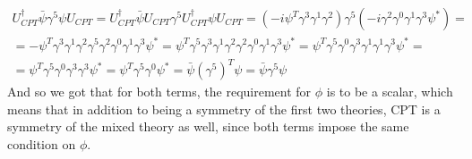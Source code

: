 \documentclass{article}
\begin{document}
\begin{equation}
\begin{gathered}
    U_{CPT}^\dagger \bar{\psi}\gamma^5\psi U_{CPT} = 
    U_{CPT}^\dagger \bar{\psi} U_{CPT} \gamma^5 U_{CPT}^\dagger \psi U_{CPT} = 
    \left(-i\psi^T\gamma^3\gamma^1\gamma^2\right) \gamma^5 \left(-i\gamma^2\gamma^0\gamma^1\gamma^3\psi^*\right) = \\ =
    -\psi^T\gamma^3\gamma^1\gamma^2\gamma^5\gamma^2\gamma^0\gamma^1\gamma^3\psi^* =
    \psi^T\gamma^5\gamma^3\gamma^1\gamma^2\gamma^2\gamma^0\gamma^1\gamma^3\psi^* =
    \psi^T\gamma^5\gamma^0\gamma^3\gamma^1\gamma^1\gamma^3\psi^* = \\ =
    \psi^T\gamma^5\gamma^0\gamma^3\gamma^3\psi^* =
    \psi^T\gamma^5\gamma^0\psi^* = \bar{\psi}\left(\gamma^5\right)^T\psi = \bar{\psi}\gamma^5\psi
\end{gathered}
\end{equation}
And so we got that for both terms, the requirement for $\phi$ is to be a scalar, which means that in addition to being a symmetry of the first two theories, CPT is a symmetry of the mixed theory as well, since both terms impose the same condition on $\phi$.
\end{document}
